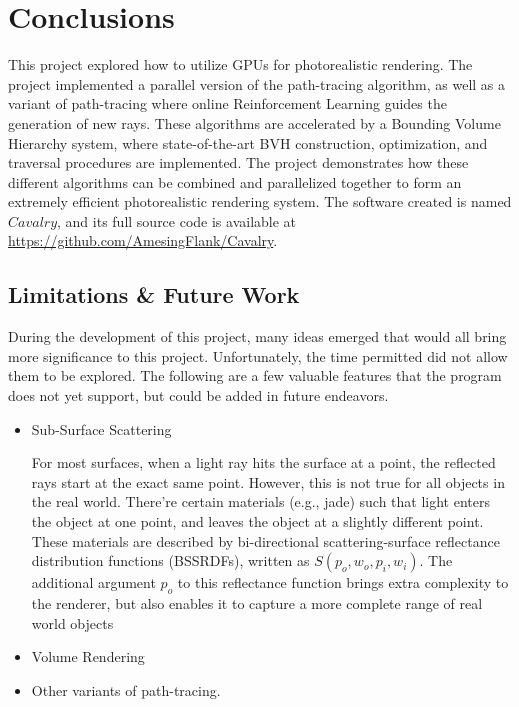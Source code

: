 \chapter{Conclusions}

This project explored how to utilize GPUs for photorealistic rendering. The project implemented a parallel version of the path-tracing algorithm, as well as a variant of path-tracing where online Reinforcement Learning guides the generation of new rays. These algorithms are accelerated by a Bounding Volume Hierarchy system, where state-of-the-art BVH construction, optimization, and traversal procedures are implemented. The project demonstrates how these different algorithms can be combined and parallelized together to form an extremely efficient photorealistic rendering system. The software created is named $Cavalry$, and its full source code is available at \url{https://github.com/AmesingFlank/Cavalry}.

\section{Limitations \& Future Work}
During the development of this project, many ideas emerged that would all bring more significance to this project. Unfortunately, the time permitted did not allow them to be explored. The following are a few valuable features that the program does not yet support, but could be added in future endeavors.

\begin{itemize}

    \item Sub-Surface Scattering
    
    For most surfaces, when a light ray hits the surface at a point, the reflected rays start at the exact same point. However, this is not true for all objects in the real world. There're certain materials (e.g., jade) such that light enters the object at one point, and leaves the object at a slightly different point. These materials are described by bi-directional scattering-surface reflectance distribution functions (BSSRDFs), written as $S(p_o,w_o,p_i,w_i)$. The additional argument $p_o$ to this reflectance function brings extra complexity to the renderer, but also enables it to capture a more complete range of real world objects

    \item Volume Rendering

    \item Other variants of path-tracing.
    


\end{itemize}